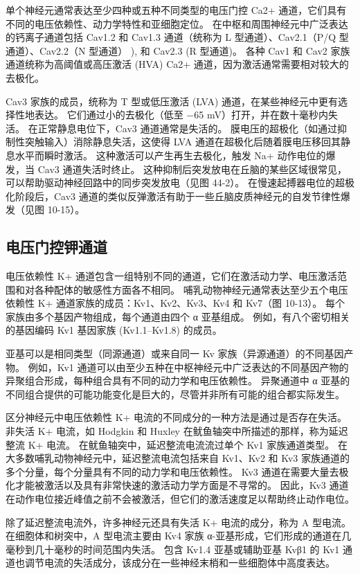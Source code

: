 单个神经元通常表达至少四种或五种不同类型的电压门控 Ca2+ 通道，它们具有不同的电压依赖性、动力学特性和亚细胞定位。 在中枢和周围神经元中广泛表达的钙离子通道包括 Cav1.2 和 Cav1.3 通道（统称为 L 型通道）、Cav2.1（P/Q 型通道）、Cav2.2（N 型通道） ), 和 Cav2.3 (R 型通道)。 各种 Cav1 和 Cav2 家族通道统称为高阈值或高压激活 (HVA) Ca2+ 通道，因为激活通常需要相对较大的去极化。

Cav3 家族的成员，统称为 T 型或低压激活 (LVA) 通道，在某些神经元中更有选择性地表达。 它们通过小的去极化（低至 −65 mV）打开，并在数十毫秒内失活。 在正常静息电位下，Cav3 通道通常是失活的。 膜电压的超极化（如通过抑制性突触输入）消除静息失活，这使得 LVA 通道在超极化后随着膜电压移回其静息水平而瞬时激活。 这种激活可以产生再生去极化，触发 Na+ 动作电位的爆发，当 Cav3 通道失活时终止。 这种抑制后突发放电在丘脑的某些区域很常见，可以帮助驱动神经回路中的同步突发放电（见图 44-2）。 在慢速起搏器电位的超极化阶段后，Cav3 通道的类似反弹激活有助于一些丘脑皮质神经元的自发节律性爆发（见图 10-15）。

\subsection{电压门控钾通道}
电压依赖性 K+ 通道包含一组特别不同的通道，它们在激活动力学、电压激活范围和对各种配体的敏感性方面各不相同。 哺乳动物神经元通常表达至少五个电压依赖性 K+ 通道家族的成员：Kv1、Kv2、Kv3、Kv4 和 Kv7（图 10-13）。 每个家族由多个基因产物组成，每个通道由四个 α 亚基组成。 例如，有八个密切相关的基因编码 Kv1 基因家族 (Kv1.1–Kv1.8) 的成员。

亚基可以是相同类型（同源通道）或来自同一 Kv 家族（异源通道）的不同基因产物。 例如，Kv1 通道可以由至少五种在中枢神经元中广泛表达的不同基因产物的异聚组合形成，每种组合具有不同的动力学和电压依赖性。 异聚通道中 α 亚基的不同组合提供的可能功能变化是巨大的，尽管并非所有可能的组合都实际发生。

区分神经元中电压依赖性 K+ 电流的不同成分的一种方法是通过是否存在失活。 非失活 K+ 电流，如 Hodgkin 和 Huxley 在鱿鱼轴突中所描述的那样，称为延迟整流 K+ 电流。 在鱿鱼轴突中，延迟整流电流流过单个 Kv1 家族通道类型。 在大多数哺乳动物神经元中，延迟整流电流包括来自 Kv1、Kv2 和 Kv3 家族通道的多个分量，每个分量具有不同的动力学和电压依赖性。 Kv3 通道在需要大量去极化才能被激活以及具有非常快速的激活动力学方面是不寻常的。 因此，Kv3 通道在动作电位接近峰值之前不会被激活，但它们的激活速度足以帮助终止动作电位。

除了延迟整流电流外，许多神经元还具有失活 K+ 电流的成分，称为 A 型电流。 在细胞体和树突中，A 型电流主要由 Kv4 家族 α-亚基形成，它们形成的通道在几毫秒到几十毫秒的时间范围内失活。 包含 Kv1.4 亚基或辅助亚基 Kvβ1 的 Kv1 通道也调节电流的失活成分，该成分在一些神经末梢和一些细胞体中高度表达。

